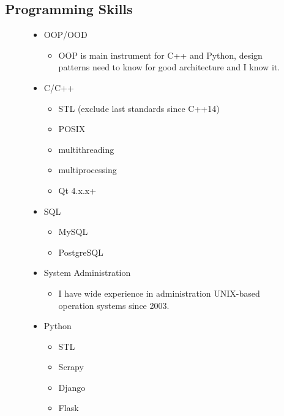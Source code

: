 \documentclass[letterpaper,11pt]{article}
\begin{document}
\subsection{Programming Skills}
  \begin{figure}[h!]
    \begin{minipage}[h!]{0.49\textwidth}
      \begin{itemize}
        \item {OOP/OOD}
          \begin{itemize}
            \item OOP is main instrument for C++ and Python, design patterns need to know for good architecture and I know it.
          \end{itemize}
        \item{C/C++}
          \begin{itemize}
	    \item STL (exclude last standards since C++14)
	    \item POSIX
	    \item multithreading
	    \item multiprocessing
	    \item Qt 4.x.x+
          \end{itemize}
        \item{SQL}
          \begin{itemize}
            \item MySQL
            \item PostgreSQL
          \end{itemize}
        \item{System Administration}
          \begin{itemize}
            \item I have wide experience in administration UNIX-based operation systems since 2003.
          \end{itemize}
      \end{itemize}
    \end{minipage}
    \hfill
    \begin{minipage}[h!]{0.49\textwidth}
      \begin{itemize}
        \item{Python}
          \begin{itemize}
            \item STL
            \item Scrapy
            \item Django
            \item Flask

\end{itemize}
\end{itemize}
\end{minipage}
\end{figure}
\end{document}
